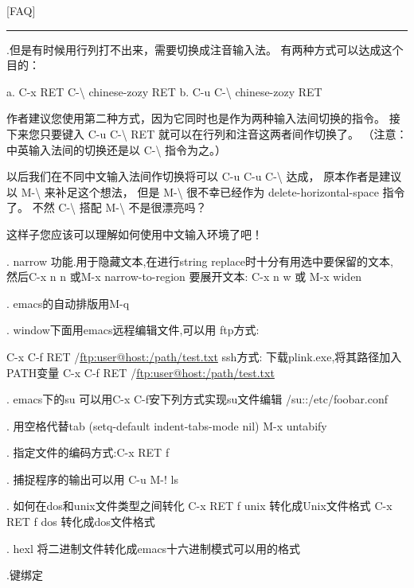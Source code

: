 \documentclass[11pt]{article}
\begin{document}
[FAQ]
\hrule
 
.但是有时候用行列打不出来，需要切换成注音输入法。
 有两种方式可以达成这个目的：

  a. C-x RET C-\textbackslash{} chinese-zozy RET
  b. C-u C-\textbackslash{} chinese-zozy RET

  作者建议您使用第二种方式，因为它同时也是作为两种输入法间切换的指令。
  接下来您只要键入 C-u C-\textbackslash{} RET 就可以在行列和注音这两者间作切换了。
 （注意：中英输入法间的切换还是以 C-\textbackslash{} 指令为之。）

  以后我们在不同中文输入法间作切换将可以 C-u C-u C-\textbackslash{} 达成，
  原本作者是建议以 M-\textbackslash{} 来补足这个想法，
  但是 M-\textbackslash{} 很不幸已经作为 delete-horizontal-space 指令了。
  不然 C-\textbackslash{} 搭配 M-\textbackslash{} 不是很漂亮吗？

  这样子您应该可以理解如何使用中文输入环境了吧！



. narrow 功能.用于隐藏文本,在进行string replace时十分有用选中要保留的文本, 然后C-x n n 或M-x narrow-to-region 要展开文本: C-x n w 或 M-x widen

. emacs的自动排版用M-q

. window下面用emacs远程编辑文件,可以用 ftp方式:

    C-x C-f RET /\href{ftp:user@host:/path/test.txt}{ftp:user@host:/path/test.txt}
    ssh方式: 下载plink.exe,将其路径加入PATH变量
    C-x C-f RET /\href{ftp:user@host:/path/test.txt}{ftp:user@host:/path/test.txt}

. emacs下的su 可以用C-x C-f安下列方式实现su文件编辑
    /su::/etc/foobar.conf

. 用空格代替tab (setq-default indent-tabs-mode nil)
    M-x untabify
    
. 指定文件的编码方式:C-x RET f


. 捕捉程序的输出可以用
    C-u M-! ls


. 如何在dos和unix文件类型之间转化
    C-x RET f unix   转化成Unix文件格式
    C-x RET f dos    转化成dos文件格式


. hexl   将二进制文件转化成emacs十六进制模式可以用的格式


.键绑定
\end{document}
